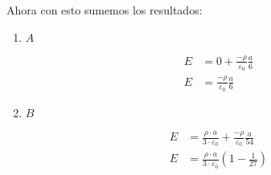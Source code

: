 \documentclass{report}
\begin{document}
Ahora con esto sumemos los resultados:
\begin{enumerate}
  \item $A$

    \begin{align*}
      E &= 0 + \frac{-\rho}{\varepsilon_0} \frac{a}{6}\\
      E &= \frac{-\rho}{\varepsilon_0} \frac{a}{6}
    \end{align*}
  \item $B$

    \begin{align*}
      E &= \frac{\rho \cdot a}{3 \cdot \varepsilon_0} + \frac{-\rho}{\varepsilon_0} \frac{a}{54} \\
      E &= \frac{\rho \cdot a}{3 \cdot \varepsilon_0}\left( 1 - \frac{1}{27} \right)
    \end{align*}
\end{enumerate}

\chapter{}
\end{document}
